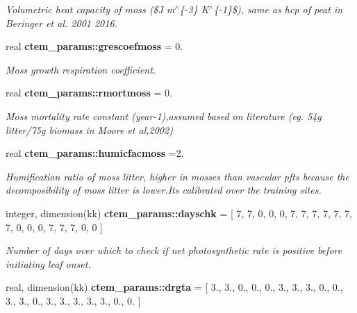 \begin{DoxyCompactItemize}
\begin{DoxyCompactList}\small\item\em Volumetric heat capacity of moss (\$\+J m$^\wedge$\{-\/3\} K$^\wedge$\{-\/1\}\$), same as hcp of peat in Beringer et al. 2001 2016. \end{DoxyCompactList}\item 
\hypertarget{namespacectem__params_ab81d40d45c446f0354132a51770591b5}{}real {\bfseries ctem\+\_\+params\+::grescoefmoss} = 0.\label{namespacectem__params_ab81d40d45c446f0354132a51770591b5}

\begin{DoxyCompactList}\small\item\em Moss growth respiration coefficient. \end{DoxyCompactList}\item 
\hypertarget{namespacectem__params_aab2faf4382f8e84aa1fe0ae95f1b3a25}{}real {\bfseries ctem\+\_\+params\+::rmortmoss} = 0.\label{namespacectem__params_aab2faf4382f8e84aa1fe0ae95f1b3a25}

\begin{DoxyCompactList}\small\item\em Moss mortality rate constant (year-\/1),assumed based on literature (eg. 54g litter/75g biomass in Moore et al,2002) \end{DoxyCompactList}\item 
\hypertarget{namespacectem__params_aee7e81fdfd02f048571b235327549b35}{}real {\bfseries ctem\+\_\+params\+::humicfacmoss} =2.\label{namespacectem__params_aee7e81fdfd02f048571b235327549b35}

\begin{DoxyCompactList}\small\item\em Humification ratio of moss litter, higher in mosses than vascular pfts because the decomposibility of moss litter is lower.\+It\textquotesingle{}s calibrated over the training sites. \end{DoxyCompactList}\item 
\hypertarget{namespacectem__params_abae86d324b328aaf473431198d8e3642}{}integer, dimension(kk) {\bfseries ctem\+\_\+params\+::dayschk} = \mbox{[} 7, 7, 0, 0, 0, 7, 7, 7, 7, 7, 7, 7, 0, 0, 0, 7, 7, 7, 0, 0 \mbox{]}\label{namespacectem__params_abae86d324b328aaf473431198d8e3642}

\begin{DoxyCompactList}\small\item\em Number of days over which to check if net photosynthetic rate is positive before initiating leaf onset. \end{DoxyCompactList}\item 
\hypertarget{namespacectem__params_ad4b4b2e3174bff5d48329ff00f79da67}{}real, dimension(kk) {\bfseries ctem\+\_\+params\+::drgta} = \mbox{[} 3., 3., 0., 0., 0., 3., 3., 3., 0., 0., 3., 3., 0., 3., 3., 3., 3., 3., 0., 0. \mbox{]}\label{namespacectem__params_ad4b4b2e3174bff5d48329ff00f79da67}


\end{DoxyCompactItemize}
